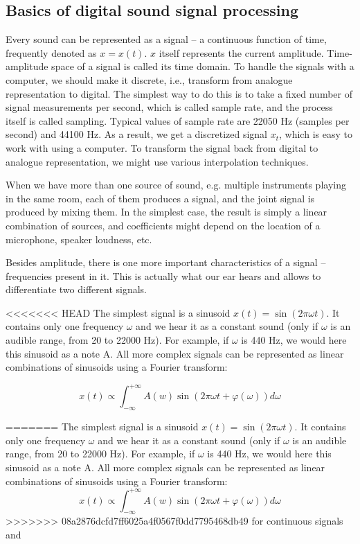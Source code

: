\documentclass[../main.tex]{subfiles} %
\begin{document}
\subsection{Basics of digital sound signal processing}

Every sound can be represented as a signal -- a continuous function of time, frequently denoted as $x = x(t)$. $x$ itself represents the current amplitude. Time-amplitude space of a signal is called its time domain.
To handle the signals with a computer, we should make it discrete, i.e., transform from analogue representation to digital. The simplest way to do this is to take a fixed number of signal measurements per second, which is called sample rate, and the process itself is called sampling. 
Typical values of sample rate are 22050 Hz (samples per second) and 44100 Hz. 
As a result, we get a discretized signal $x_t$, which is easy to work with using a computer. 
To transform the signal back from digital to analogue representation, we might use various interpolation techniques.

When we have more than one source of sound, e.g. multiple instruments playing in the same room, each of them produces a signal, and the joint signal is produced by mixing them. 
In the simplest case, the result is simply a linear combination of sources, and coefficients might depend on the location of a microphone, speaker loudness, etc.


Besides amplitude, there is one more important characteristics of a signal -- frequencies present in it. 
This is actually what our ear hears and allows to differentiate two different signals.

<<<<<<< HEAD
The simplest signal is a sinusoid $x(t) = \sin(2\pi \omega t)$. It contains only one frequency $\omega$ and we hear it as a constant sound (only if $\omega$ is an audible range, from 20 to 22000 Hz). For example, if $\omega$ is 440 Hz, we would here this sinusoid as a note A.
All more complex signals can be represented as linear combinations of sinusoids using a Fourier transform:

\[x(t) \propto \int_{-\infty}^{+\infty} A(w) \sin(2\pi \omega t + \varphi(\omega)) d \omega\]

=======
The simplest signal is a sinusoid $x(t) = \sin(2\pi \omega t)$. 
It contains only one frequency $\omega$ and we hear it as a constant sound (only if $\omega$ is an audible range, from 20 to 22000 Hz).
For example, if $\omega$ is 440 Hz, we would here this sinusoid as a note A.
All more complex signals can be represented as linear combinations of sinusoids using a Fourier transform: 
\[ x(t) \propto \int_{-\infty}^{+\infty} A(w) \sin(2\pi \omega t + \varphi(\omega)) d \omega \]
>>>>>>> 08a2876dcfd7ff6025a4f0567f0dd7795468db49
for continuous signals and 
\end{document}
